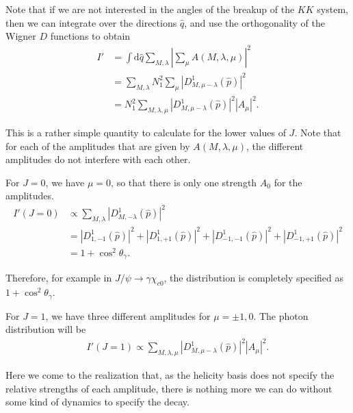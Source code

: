 \documentclass[11pt]{article}
\begin{document}
Note that if we are not interested in the angles of the breakup of the
$KK$ system, then we can integrate over the directions $\hat{q}$, and
use the orthogonality of the Wigner $D$ functions to obtain
\begin{align}
  I' &= \int \mathrm{d} \hat{q} \sum_{M, \lambda} \left| \sum_{\mu}
  A(M, \lambda, \mu) \right|^{2} \\
  &= \sum_{M, \lambda} N_{1}^{2} \sum_{\mu}
  \left| D^{1}_{M,\mu-\lambda} (\hat{p}) \right|^{2} \\
  &= N_{1}^{2} \sum_{M,\lambda,\mu} \left|D^{1}_{M,\mu-\lambda}
  (\hat{p}) \right|^{2} \left| A_{\mu}
  \right|^{2}. \label{eq:intensity_helicity}
\end{align}

This is a rather simple quantity to calculate for the lower values of
$J$. Note that for each of the amplitudes that are given by $A(M,
\lambda, \mu)$, the different amplitudes do not interfere with each
other.

For $J=0$, we have $\mu=0$, so that there is only one strength $A_{0}$
for the amplitudes.
\begin{align}
  I' (J=0) &\propto  \sum_{M, \lambda} \left| D^{1}_{M,-\lambda}
  (\hat{p}) \right|^{2} \\
  &= \left| D^{1}_{1,-1} (\hat{p}) \right|^{2} + \left| D^{1}_{1,+1}
  (\hat{p}) \right|^{2} + \left| D^{1}_{-1,-1} (\hat{p}) \right|^{2} +
  \left| D^{1}_{-1,+1} (\hat{p}) \right|^{2} \\
  &= 1 + \cos^{2} \theta_{\gamma}.
\end{align}

Therefore, for example in $J/\psi \to \gamma \chi_{c0}$, the
distribution is completely specified as $1 + \cos^{2}
\theta_{\gamma}$.

For $J=1$, we have three different amplitudes for $\mu = \pm 1,
0$. The photon distribution will be
\begin{align}
  I' (J=1) \propto  \sum_{M, \lambda, \mu} \left| D^{1}_{M,\mu-\lambda}
  (\hat{p}) \right|^{2} \left| A_{\mu} \right|^{2}.
\end{align}

Here we come to the realization that, as the helicity basis does not
specify the relative strengths of each amplitude, there is nothing
more we can do without some kind of dynamics to specify the decay.
\end{document}
